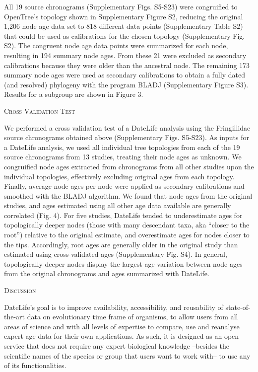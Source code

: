 \documentclass[english,man]{apa6}
\begin{document}
All 19 source chronograms (Supplementary Figs. S5-S23) were congruified to OpenTree's topology shown in Supplementary Figure S2, reducing the original 1,206 node age data set to 818 different data points (Supplementary Table S2) that could be used as calibrations for the chosen topology (Supplementary Fig. S2). The congruent node age data points were summarized for each node, resulting in 194 summary node ages. From these 21 were excluded as secondary calibrations because they were older than the ancestral node. The remaining 173 summary node ages were used as secondary calibrations to obtain a fully dated (and resolved) phylogeny with the program BLADJ (Supplementary Figure S3). Results for a subgroup are shown in Figure 3.

\begin{center}
\textsc{Cross-Validation Test}
\end{center}

We performed a cross validation test of a DateLife analysis using the Fringillidae source chronograms obtained above (Supplementary Figs. S5-S23).
As inputs for a DateLife analysis, we used all individual tree topologies from each of the 19 source chronograms from 13 studies, treating their node ages as unknown.
We congruified node ages extracted from chronograms from all other studies upon the individual topologies, effectively excluding original ages from each topology. Finally, average node ages per node were applied as secondary calibrations and smoothed with the BLADJ algorithm.
We found that node ages from the original studies, and ages estimated using all other age data available are generally correlated (Fig. 4).
For five studies, DateLife tended to underestimate ages for topologically deeper nodes (those with many descendant taxa, aka \enquote{closer to the root}) relative to the original estimate, and overestimate ages for nodes closer to the tips. Accordingly, root ages are generally older in the original study than estimated using cross-validated ages (Supplementary Fig. S4).
In general, topologically deeper nodes display the largest age variation between node ages from the original chronograms and ages summarized with DateLife.

\begin{center}
\textsc{Discussion}
\end{center}

DateLife's goal is to improve availability, accessibility, and reusability of state-of-the-art data on evolutionary time frame of organisms, to allow users from all areas of science and with all levels of expertise to compare, use and reanalyse expert age data for their own applications. As such, it is designed as an open service that does not require any expert biological knowledge --besides the scientific names of the species or group that users want to work with-- to use any of its functionalities.
\end{document}
